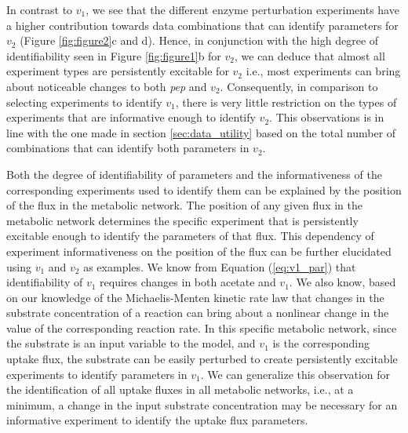 \documentclass[10pt]{article}
\begin{document}
	In contrast to $v_1$, we see that the different enzyme perturbation experiments have a higher contribution towards data combinations that can identify parameters for $v_2$ (Figure \ref{fig:figure2}c and d). Hence, in conjunction with the high degree of identifiability seen in Figure \ref{fig:figure1}b for $v_2$, we can deduce that almost all experiment types are persistently excitable for $v_2$ i.e., most experiments can bring about noticeable changes to both \textit{pep} and $v_2$. Consequently, in comparison to selecting experiments to identify $v_1$, there is very little restriction on the types of experiments that are informative enough to identify $v_2$. This observations is in line with the one made in section \ref{sec:data_utility} based on the total number of combinations that can identify both parameters in $v_2$.
	
	Both the degree of identifiability of parameters and the informativeness of the corresponding experiments used to identify them can be explained by the position of the flux in the metabolic network. The position of any given flux in the metabolic network determines the specific experiment that is persistently excitable enough to identify the parameters of that flux. This dependency of experiment informativeness on the position of the flux can be further elucidated using $v_1$ and $v_2$ as examples. We know from Equation (\ref{eq:v1_par}) that identifiability of $v_1$ requires changes in both acetate and $v_1$. We also know, based on our knowledge of the Michaelis-Menten kinetic rate law that changes in the substrate concentration of a reaction can bring about a nonlinear change in the value of the corresponding reaction rate. In this specific metabolic network, since the substrate is an input variable to the model, and $v_1$ is the corresponding uptake flux, the substrate can be easily perturbed to create persistently excitable experiments to identify parameters in $v_1$. We can generalize this observation for the identification of all uptake fluxes in all metabolic networks, i.e., at a minimum, a change in the input substrate concentration may be necessary for an informative experiment to identify the uptake flux parameters. 
	
\end{document}
